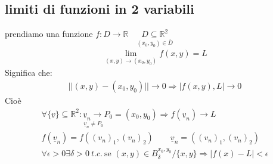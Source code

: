 \documentclass[a4paper, oneside]{article}
\begin{document}
            \subsection{limiti di funzioni in 2 variabili}
            prendiamo una funzione $f:D \to \mathbb{R} \quad  \underset{(x_0,y_0) \in \overline{D}}{D \subseteq \mathbb{R}^2}$
            \begin{gather*}
                \lim_{(x,y) \to (x_0,y_0)} f(x,y)= L
            \end{gather*}
            Significa che:
            \begin{gather*}
                ||(x,y) -(x_0,y_0)|| \to 0 \Rightarrow |f(x,y), L| \to 0
            \end{gather*}
            Cioè
            \begin{gather*}
                \forall \{\underline{v}\} \subseteq \mathbb{R}^2 : \underset{\underline{v}_n \neq P_0}{\underline{v}_n \to }P_0 = (x_0, y_0) \Rightarrow f(\underline{v}_n) \to L\\
                f(\underline{v}_n) = f((v_n)_1, (v_n)_2) \qquad \underline{v}_n = ((v_n)_1, (v_n)_2)\\
                \forall \epsilon > 0 \exists \delta > 0 \ t.c. \ \text{se } (x,y) \in B_\delta^{x_0,y_0} / \{x,y\} \Rightarrow |f(x) - L| <\epsilon    
            \end{gather*}
\end{document}
